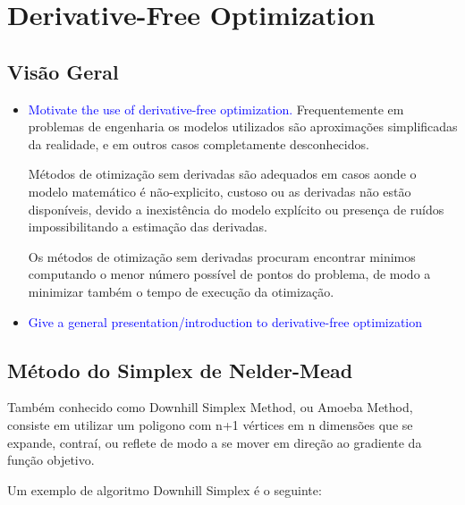 \chapter{Derivative-Free Optimization} \label{chap:3}


\section{Visão Geral}

\begin{itemize}


\item \textcolor{blue}{Motivate the use of derivative-free optimization.}
Frequentemente em problemas de engenharia os modelos utilizados são aproximações simplificadas da realidade, e em outros casos completamente desconhecidos.

Métodos de otimização sem derivadas são adequados em casos aonde o modelo matemático é não-explicito, custoso ou as derivadas não estão disponíveis, devido a inexistência do modelo explícito ou presença de ruídos impossibilitando a estimação das derivadas.

Os métodos de otimização sem derivadas procuram encontrar minimos computando o menor número possível de pontos do problema, de modo a minimizar também o tempo de execução da otimização.



\item \textcolor{blue}{Give a general presentation/introduction to derivative-free optimization}

\end{itemize}


\section{Método do Simplex de Nelder-Mead}

Também conhecido como Downhill Simplex Method, ou Amoeba Method, consiste em utilizar um poligono com n+1 vértices em n dimensões que se expande, contraí, ou reflete de modo a se mover em direção ao gradiente da função objetivo.

Um exemplo de algoritmo Downhill Simplex é o seguinte:

